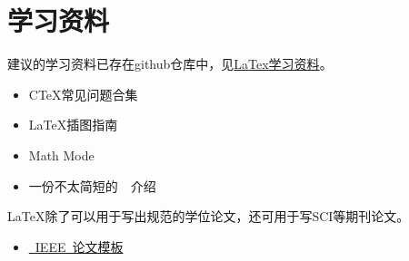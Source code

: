 \chapter{学习资料}
\label{chap:material}

建议的学习资料已存在github仓库中，见\href{https://github.com/BIT-thesis/LaTex-template/tree/master/LaTex%E5%AD%A6%E4%B9%A0%E8%B5%84%E6%96%99}{LaTex学习资料}。

\begin{itemize}
\item C\TeX 常见问题合集
\item \LaTeX 插图指南
\item Math Mode
\item 一份不太简短的~\LaTeXe{}~介绍

\end{itemize}

\LaTeX 除了可以用于写出规范的学位论文，还可用于写SCI等期刊论文。

\begin{itemize}
\item \href{http://www.ctan.org/tex-archive/macros/latex/contrib/IEEEtran/}{~IEEE~­论文模板}

\end{itemize}